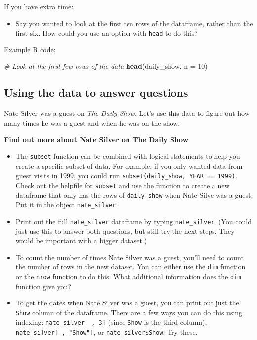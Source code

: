 \documentclass[]{book}
\makeatletter
\newenvironment{Shaded}{\begin{snugshade}}{\end{snugshade}}
\newcommand{\KeywordTok}[1]{\textcolor[rgb]{0.13,0.29,0.53}{\textbf{#1}}}
\newcommand{\DataTypeTok}[1]{\textcolor[rgb]{0.13,0.29,0.53}{#1}}
\newcommand{\DecValTok}[1]{\textcolor[rgb]{0.00,0.00,0.81}{#1}}
\newcommand{\CommentTok}[1]{\textcolor[rgb]{0.56,0.35,0.01}{\textit{#1}}}
\newcommand{\NormalTok}[1]{#1}
\providecommand{\tightlist}{%
  \setlength{\itemsep}{0pt}\setlength{\parskip}{0pt}}
\newenvironment{kframe}{%
\medskip{}
\setlength{\fboxsep}{.8em}
 \def\at@end@of@kframe{}%
 \ifinner\ifhmode%
  \def\at@end@of@kframe{\end{minipage}}%
  \begin{minipage}{\columnwidth}%
 \fi\fi%
 \def\FrameCommand##1{\hskip\@totalleftmargin \hskip-\fboxsep
 \colorbox{shadecolor}{##1}\hskip-\fboxsep
     \hskip-\linewidth \hskip-\@totalleftmargin \hskip\columnwidth}%
 \MakeFramed {\advance\hsize-\width
   \@totalleftmargin\z@ \linewidth\hsize
   \@setminipage}}%
 {\par\unskip\endMakeFramed%
 \at@end@of@kframe}
\renewenvironment{Shaded}{\begin{kframe}}{\end{kframe}}
\theoremstyle{definition}
\theoremstyle{definition}
\theoremstyle{definition}
\theoremstyle{remark}
\makeatother
\begin{document}
If you have extra time:

\begin{itemize}
\tightlist
\item
  Say you wanted to look at the first ten rows of the dataframe, rather
  than the first six. How could you use an option with \texttt{head} to
  do this?
\end{itemize}

Example R code:

\begin{Shaded}
\begin{Highlighting}[]
\CommentTok{# Look at the first few rows of the data}
\KeywordTok{head}\NormalTok{(daily_show, }\DataTypeTok{n =} \DecValTok{10}\NormalTok{)}
\end{Highlighting}
\end{Shaded}

\subsection{Using the data to answer
questions}\label{using-the-data-to-answer-questions}

Nate Silver was a guest on \emph{The Daily Show}. Let's use this data to
figure out how many times he was a guest and when he was on the show.

\textbf{Find out more about Nate Silver on The Daily Show}

\begin{itemize}
\tightlist
\item
  The \texttt{subset} function can be combined with logical statements
  to help you create a specific subset of data. For example, if you only
  wanted data from guest visits in 1999, you could run
  \texttt{subset(daily\_show,\ YEAR\ ==\ 1999)}. Check out the helpfile
  for \texttt{subset} and use the function to create a new dataframe
  that only has the rows of \texttt{daily\_show} when Nate Silve was a
  guest. Put it in the object \texttt{nate\_silver}.
\item
  Print out the full \texttt{nate\_silver} dataframe by typing
  \texttt{nate\_silver}. (You could just use this to answer both
  questions, but still try the next steps. They would be important with
  a bigger dataset.)
\item
  To count the number of times Nate Silver was a guest, you'll need to
  count the number of rows in the new dataset. You can either use the
  \texttt{dim} function or the \texttt{nrow} function to do this. What
  additional information does the \texttt{dim} function give you?
\item
  To get the dates when Nate Silver was a guest, you can print out just
  the \texttt{Show} column of the dataframe. There are a few ways you
  can do this using indexing: \texttt{nate\_silver{[}\ ,\ 3{]}} (since
  \texttt{Show} is the third column),
  \texttt{nate\_silver{[}\ ,\ "Show"{]}}, or
  \texttt{nate\_silver\$Show}. Try these.
\end{itemize}
\end{document}
